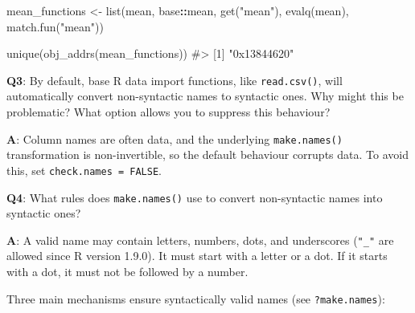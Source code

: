 \documentclass[
]{krantz}
\makeatletter
\newenvironment{Shaded}{\begin{snugshade}}{\end{snugshade}}
\newcommand{\CommentTok}[1]{\textcolor[rgb]{0.56,0.35,0.01}{\textit{#1}}}
\newcommand{\KeywordTok}[1]{\textcolor[rgb]{0.13,0.29,0.53}{\textbf{#1}}}
\newcommand{\NormalTok}[1]{#1}
\newcommand{\OperatorTok}[1]{\textcolor[rgb]{0.81,0.36,0.00}{\textbf{#1}}}
\newcommand{\StringTok}[1]{\textcolor[rgb]{0.31,0.60,0.02}{#1}}
\newenvironment{kframe}{%
\medskip{}
\setlength{\fboxsep}{.8em}
 \def\at@end@of@kframe{}%
 \ifinner\ifhmode%
  \def\at@end@of@kframe{\end{minipage}}%
  \begin{minipage}{\columnwidth}%
 \fi\fi%
 \def\FrameCommand##1{\hskip\@totalleftmargin \hskip-\fboxsep
 \colorbox{shadecolor}{##1}\hskip-\fboxsep
     \hskip-\linewidth \hskip-\@totalleftmargin \hskip\columnwidth}%
 \MakeFramed {\advance\hsize-\width
   \@totalleftmargin\z@ \linewidth\hsize
   \@setminipage}}%
 {\par\unskip\endMakeFramed%
 \at@end@of@kframe}
\renewenvironment{Shaded}{\begin{kframe}}{\end{kframe}}
\renewcommand{\KeywordTok} [1]{\textcolor[rgb]{0.00,0.44,0.13}{{#1}}}
\renewcommand{\StringTok}  [1]{\textcolor[rgb]{0.25,0.44,0.63}{{#1}}}
\renewcommand{\CommentTok} [1]{\textcolor[rgb]{0.38,0.63,0.69}{{#1}}}
\renewcommand{\NormalTok}  [1]{{#1}}
\makeatother
\begin{document}
\begin{Shaded}
\begin{Highlighting}[]
\NormalTok{mean_functions <-}\StringTok{ }\KeywordTok{list}\NormalTok{(mean,}
\NormalTok{                       base}\OperatorTok{::}\NormalTok{mean,}
                       \KeywordTok{get}\NormalTok{(}\StringTok{"mean"}\NormalTok{),}
                       \KeywordTok{evalq}\NormalTok{(mean),}
                       \KeywordTok{match.fun}\NormalTok{(}\StringTok{"mean"}\NormalTok{))}

\KeywordTok{unique}\NormalTok{(}\KeywordTok{obj_addrs}\NormalTok{(mean_functions))}
\CommentTok{#> [1] "0x13844620"}
\end{Highlighting}
\end{Shaded}

\textbf{{Q3}}: By default, base R data import functions, like \texttt{read.csv()}, will automatically convert non-syntactic names to syntactic ones. Why might this be problematic? What option allows you to suppress this behaviour?

\textbf{{A}}: Column names are often data, and the underlying \texttt{make.names()} transformation is non-invertible, so the default behaviour corrupts data. To avoid this, set \texttt{check.names\ =\ FALSE}.

\textbf{{Q4}}: What rules does \texttt{make.names()} use to convert non-syntactic names into syntactic ones?

\textbf{{A}}: A valid name may contain letters, numbers, dots, and underscores (\texttt{"\_"} are allowed since R version 1.9.0). It must start with a letter or a dot. If it starts with a dot, it must not be followed by a number.

Three main mechanisms ensure syntactically valid names (see \texttt{?make.names}):
\end{document}
